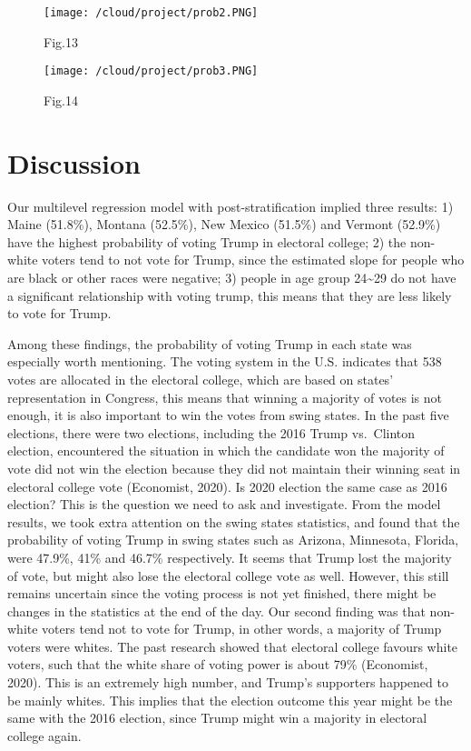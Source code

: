 \documentclass[
]{article}
\begin{document}
\begin{figure}
\centering
\texttt{[image: /cloud/project/prob2.PNG]}
\caption{Fig.13}
\end{figure}

\begin{figure}
\centering
\texttt{[image: /cloud/project/prob3.PNG]}
\caption{Fig.14}
\end{figure}

\hypertarget{discussion}{%
\section{Discussion}\label{discussion}}

Our multilevel regression model with post-stratification implied three
results: 1) Maine (51.8\%), Montana (52.5\%), New Mexico (51.5\%) and
Vermont (52.9\%) have the highest probability of voting Trump in
electoral college; 2) the non-white voters tend to not vote for Trump,
since the estimated slope for people who are black or other races were
negative; 3) people in age group 24\textasciitilde29 do not have a
significant relationship with voting trump, this means that they are
less likely to vote for Trump.

Among these findings, the probability of voting Trump in each state was
especially worth mentioning. The voting system in the U.S. indicates
that 538 votes are allocated in the electoral college, which are based
on states' representation in Congress, this means that winning a
majority of votes is not enough, it is also important to win the votes
from swing states. In the past five elections, there were two elections,
including the 2016 Trump vs.~Clinton election, encountered the situation
in which the candidate won the majority of vote did not win the election
because they did not maintain their winning seat in electoral college
vote (Economist, 2020). Is 2020 election the same case as 2016 election?
This is the question we need to ask and investigate. From the model
results, we took extra attention on the swing states statistics, and
found that the probability of voting Trump in swing states such as
Arizona, Minnesota, Florida, were 47.9\%, 41\% and 46.7\% respectively.
It seems that Trump lost the majority of vote, but might also lose the
electoral college vote as well. However, this still remains uncertain
since the voting process is not yet finished, there might be changes in
the statistics at the end of the day. Our second finding was that
non-white voters tend not to vote for Trump, in other words, a majority
of Trump voters were whites. The past research showed that electoral
college favours white voters, such that the white share of voting power
is about 79\% (Economist, 2020). This is an extremely high number, and
Trump's supporters happened to be mainly whites. This implies that the
election outcome this year might be the same with the 2016 election,
since Trump might win a majority in electoral college again.
\end{document}
